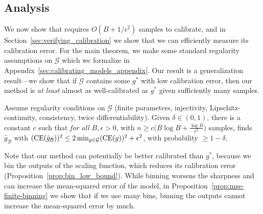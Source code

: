 


\subsection{Analysis}

We now show that \ourcal{} requires $O(B + 1/\epsilon^2)$ samples to calibrate, and in Section~\ref{sec:verifying_calibration} we show that we can efficiently measure its calibration error. For the main theorem, we make some standard regularity assumptions on $\mathcal{G}$ which we formalize in Appendix~\ref{sec:calibrating_models_appendix}. Our result is a generalization result---we show that if $\mathcal{G}$ contains some $g^*$ with low calibration error, then our method is \emph{at least} almost as well-calibrated as $g^*$ given sufficiently many samples.

\newcommand{\finalCalibText}{
Assume regularity conditions on $\mathcal{G}$ (finite parameters, injectivity, Lipschitz-continuity, consistency, twice differentiability). Given $\delta \in (0, 1)$, there is a constant $c$ such that \emph{for all} $B, \epsilon > 0$, with $n \geq c\Big(B\log{B} + \frac{\log{B}}{\epsilon^2}\Big)$ samples, \ourcal{} finds $\hat{g}_{\mathcal{B}}$ with $(\ce(\hat{g}_{\mathcal{B}}))^2 \leq 2\min_{g \in \mathcal{G}}(\ce(g))^2 + \epsilon^2$, with probability $\geq 1 - \delta$.
}

\begin{theorem}
\label{thm:final-calib}
\finalCalibText{}
\end{theorem}

\newtheorem*{finalCalib}{Restatement of Theorem~\ref{thm:final-calib}}


Note that our method can potentially be better calibrated than $g^*$, because we bin the outputs of the scaling function, which reduces its calibration error (Proposition~\ref{prop:bin_low_bound}). While binning worsens the sharpness and can increase the mean-squared error of the model, in Proposition~\ref{prop:mse-finite-binning} we show that if we use many bins, binning the outputs cannot increase the mean-squared error by much.

